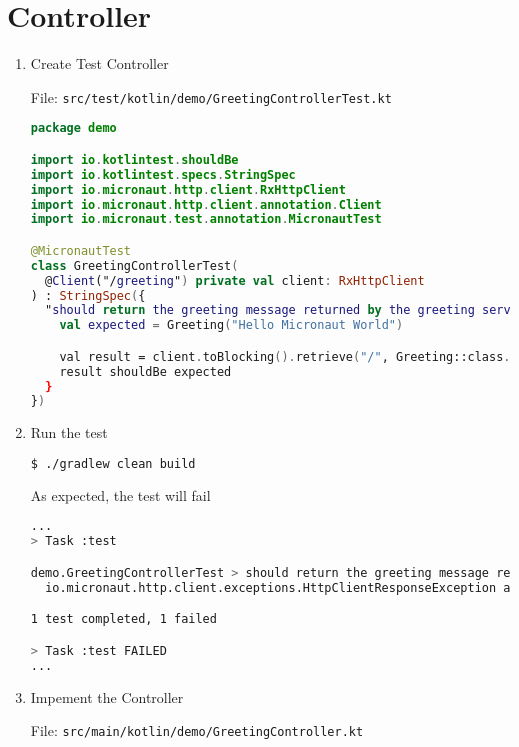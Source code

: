 \section{Controller}\label{sec:controller}

\begin{enumerate}

	\item  Create Test Controller

	      File: \texttt{src/test/kotlin/demo/GreetingControllerTest.kt}

	      \begin{lstlisting}[language=Kotlin]
package demo

import io.kotlintest.shouldBe
import io.kotlintest.specs.StringSpec
import io.micronaut.http.client.RxHttpClient
import io.micronaut.http.client.annotation.Client
import io.micronaut.test.annotation.MicronautTest

@MicronautTest
class GreetingControllerTest(
  @Client("/greeting") private val client: RxHttpClient
) : StringSpec({
  "should return the greeting message returned by the greeting service" {
    val expected = Greeting("Hello Micronaut World")

    val result = client.toBlocking().retrieve("/", Greeting::class.java)
    result shouldBe expected
  }
})
	      \end{lstlisting}

	\item Run the test

	      \begin{lstlisting}[language=bash]
$ ./gradlew clean build
	      \end{lstlisting}

	      As expected, the test will fail

	      \begin{lstlisting}[language=bash]
...
> Task :test

demo.GreetingControllerTest > should return the greeting message returned by the greeting service FAILED
  io.micronaut.http.client.exceptions.HttpClientResponseException at DefaultHttpClient.java:2030

1 test completed, 1 failed

> Task :test FAILED
...
	      \end{lstlisting}

	\item Impement the Controller

	      File: \texttt{src/main/kotlin/demo/GreetingController.kt}


\end{enumerate}
